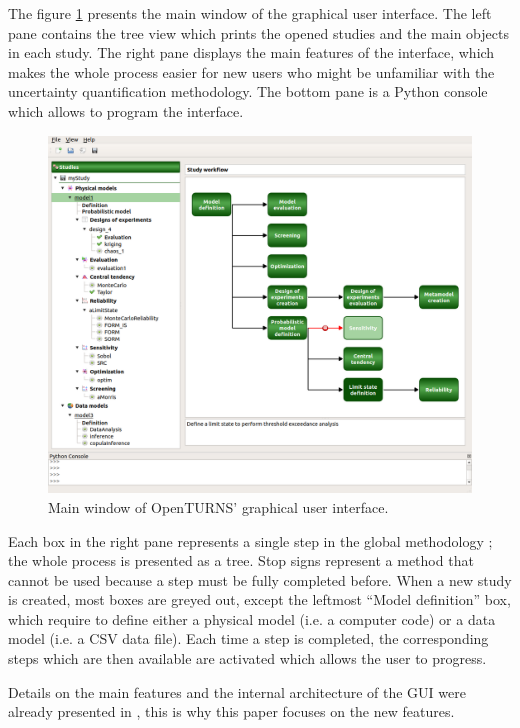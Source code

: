 \documentclass{uncecomp2019}
\begin{document}
The figure \ref{fig:mainview} presents the main window of the graphical user interface. 
The left pane contains the tree view which prints the opened studies and the 
main objects in each study. 
The right pane displays the main features of the interface, which 
makes the whole process easier for new users who might be 
unfamiliar with the uncertainty quantification methodology. 
The bottom pane is a Python console which allows to program the interface. 

\begin{figure}
\begin{center}
    \includegraphics[width=\textwidth]{figures/gui_Diagram} 
\end{center}
\caption{Main window of OpenTURNS' graphical user interface.}
\label{fig:mainview}
\end{figure}

Each box in the right pane represents a single step in the global methodology ; 
the whole process is presented as a tree. 
Stop signs represent a method that cannot be used because a step must be fully 
completed before. 
When a new study is created, most boxes are greyed out, except the 
leftmost ``Model definition'' box, which require to define either 
a physical model (i.e. a computer code) or a data model (i.e. a CSV data file).
Each time a step is completed, the corresponding steps which are then available 
are activated which allows the user to progress.  

Details on the main features and the internal architecture of the GUI were already presented in \cite{OpenTURNSUncecomp17}, 
this is why this paper focuses on the new features. 
\end{document}
